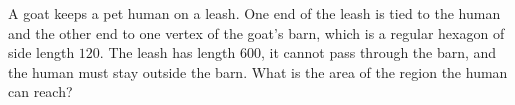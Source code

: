 A goat keeps a pet human on a leash. One end of the leash is tied to the human and the other end to one vertex of the goat's barn, which is a regular hexagon of side length $120$. The leash has length $600$, it cannot pass through the barn, and the human must stay outside the barn. What is the area of the region the human can reach?
